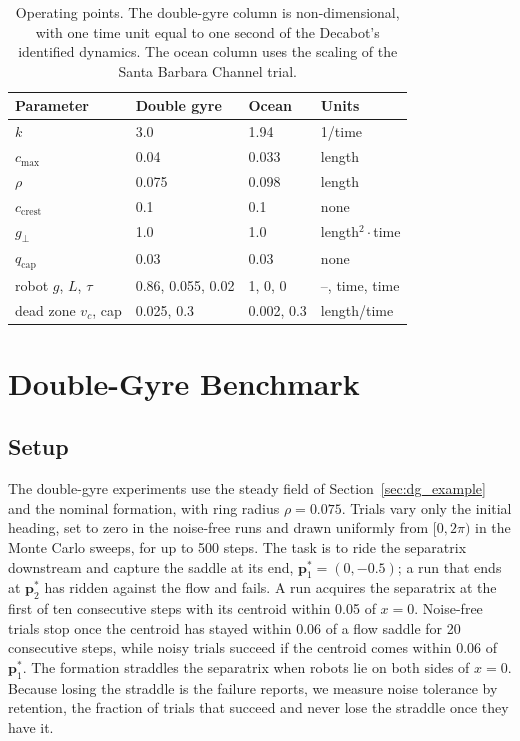 \documentclass[lettersize,journal]{IEEEtran}
\newcommand{\rev}[1]{#1}
\begin{document}
\begin{table}[!t]
\caption{Operating points. The double-gyre column is non-dimensional,
with one time unit equal to one second of the Decabot's identified
dynamics. The ocean column uses the scaling of the Santa Barbara Channel
trial.}
\label{tab:params}
\centering
\begin{tabular}{llll}
\hline
Parameter & Double gyre & Ocean & Units \\
\hline
$k$                     & 3.0   & 1.94   & 1/time \\
$c_{\max}$              & 0.04  & 0.033  & length \\
$\rho$                  & 0.075 & 0.098  & length \\
$c_{\mathrm{crest}}$    & 0.1   & 0.1    & none \\
$g_\perp$               & 1.0   & 1.0    & length$^2\cdot$time \\
$q_{\mathrm{cap}}$      & 0.03  & 0.03   & none \\
robot $g$, $L$, $\tau$   & \rev{0.86}, \rev{0.055}, \rev{0.02} & 1, 0, 0 & --, time, time \\
dead zone $v_c$, cap     & 0.025, 0.3 & 0.002, 0.3 & length/time \\
\hline
\end{tabular}
\end{table}


\section{Double-Gyre Benchmark}
\label{sec:dg_bench}

\subsection{Setup}

The double-gyre experiments use the steady field of
Section~\ref{sec:dg_example} and the nominal formation, with ring radius
$\rho = 0.075$. Trials vary only the initial heading, set to zero in the
noise-free runs and drawn uniformly from $[0, 2\pi)$ in the Monte Carlo
sweeps, for up to 500 steps. The task is to ride the separatrix downstream
and capture the saddle at its end, $\mathbf{p}^*_1 = (0, -0.5)$; a run
that ends at $\mathbf{p}^*_2$ has ridden against the flow and fails. A
run acquires the separatrix at the first of ten consecutive
steps with its centroid within 0.05 of $x = 0$. Noise-free trials stop once
the centroid has stayed within 0.06 of a flow saddle for 20 consecutive
steps, while noisy trials succeed if the centroid comes within 0.06 of
$\mathbf{p}^*_1$. The formation straddles the separatrix when robots lie
on both sides of $x = 0$. Because losing the straddle is the failure
\cite{26} reports, we measure noise tolerance by retention, the fraction
of trials that succeed and never lose the straddle once they have it.
\end{document}
